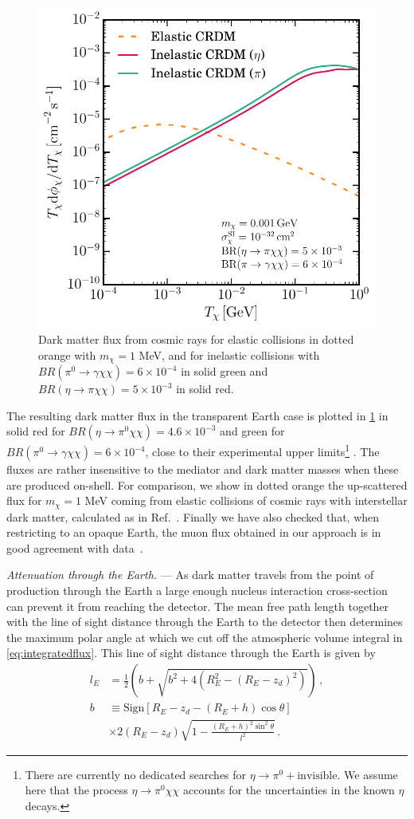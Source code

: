 \documentclass[prl,twocolumn,groupedaddress,nofootinbib, superscriptaddress]{revtex4-1}
\begin{document}
\begin{figure}
\begin{center}
\includegraphics[width=0.45 \textwidth]{pion_eta_chi_no_title.pdf}
\end{center}
\caption{Dark matter flux from cosmic rays for elastic collisions in dotted orange with $m_\chi = 1$ MeV, and for inelastic collisions with $BR(\pi^0 \to \gamma \chi \chi) = 6 \times 10^{-4}$ in solid green and $BR(\eta \to \pi\chi\chi) = 5 \times 10^{-3}$ in solid red.
\label{fig:flux}}
\end{figure}


The resulting dark matter flux in the transparent Earth case is plotted in \cref{fig:flux} in solid red for $BR(\eta \to \pi^0\chi\chi) = 4.6\times10^{-3}$ and green for $BR(\pi^0 \to \gamma\chi\chi) = 6\times 10^{-4}$, close to their experimental upper limits\footnote{There are currently no dedicated searches for $\eta \to \pi^0+\textrm{invisible}$. We assume here that the process $\eta \to \pi^0\chi\chi$ accounts for the uncertainties in the known $\eta$ decays.} \cite{Tanabashi:2018oca}. The fluxes are rather insensitive to the mediator and dark matter masses when these are produced on-shell. For comparison, we show in dotted orange the up-scattered flux for $m_\chi = 1$ MeV coming from elastic collisions of cosmic rays with interstellar dark matter, calculated as in Ref.~\cite{Bringmann:2018cvk}. Finally we have also checked that, when restricting to an opaque Earth, the muon flux obtained in our approach is in good agreement with data~\cite{Haino:2004nq,Tanabashi:2018oca}. 


{\it Attenuation through the Earth.} --- As dark matter travels from the point of production through the Earth a large enough nucleus interaction cross-section can prevent it from reaching the detector. The mean free path length together with the line of sight distance through the Earth to the detector then determines the maximum polar angle at which we cut off the atmospheric volume integral in \cref{eq:integratedflux}. This line of sight distance through the Earth is given by
%
\begin{align}
l_E &= \frac{1}{2}\left( b + \sqrt{b^2 + 4(R_E^2 - (R_E - z_d)^2)} \right) \, , \nonumber \\
b &\equiv \text{Sign}\left[R_E - z_d - (R_E + h)\cos\theta \right]  \nonumber \\
& \times 2(R_E - z_d) \sqrt{1 - \frac{(R_E +h)^2 \sin^2\theta}{l^2}} \, .
\end{align}
%
\end{document}

